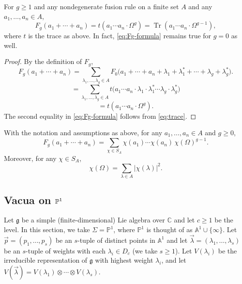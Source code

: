 \documentclass[12pt]{article}
\begin{document}
\begin{proposition}
For $g\ge 1$ and any nondegenerate fusion rule on a finite set $A$ and any $a_1,\dots,a_n\in A$,
\begin{equation}\label{eq:Fg-formula}
F_g(a_1+\cdots + a_n)
= t(a_1\cdots a_n \cdot \Omega^g)
= \operatorname{Tr}(a_1\cdots a_n \cdot \Omega^{g-1}),
\end{equation}
where $t$ is the trace as above. In fact, \eqref{eq:Fg-formula} remains true for $g=0$ as well.
\end{proposition}

\begin{proof}
By the definition of $F_g$,
\[
F_g(a_1+\cdots + a_n)
= \sum_{\lambda_1,\dots,\lambda_g\in A}
F_0\bigl(a_1+\cdots + a_n + \lambda_1+\lambda_1^* + \cdots + \lambda_g+\lambda_g^*\bigr).
\]
\[
= \sum_{\lambda_1,\dots,\lambda_g\in A}
t\bigl(a_1\cdots a_n \cdot \lambda_1\cdot \lambda_1^* \cdots \lambda_g\cdot \lambda_g^*\bigr)
\]
\[
= t(a_1\cdots a_n \cdot \Omega^g).
\]
The second equality in \eqref{eq:Fg-formula} follows from \eqref{eq:trace}.
\end{proof}

\begin{corollary}\label{cor:casimir}
With the notation and assumptions as above, for any $a_1,\dots,a_n\in A$ and $g\ge 0$,
\begin{equation}\label{eq:character-sum}
F_g(a_1+\cdots + a_n)
= \sum_{\chi\in S_A} \chi(a_1)\cdots \chi(a_n)\, \chi(\Omega)^{g-1}.
\end{equation}
Moreover, for any $\chi\in S_A$,
\begin{equation}\label{eq:omega-eigen}
\chi(\Omega) = \sum_{\lambda\in A} |\chi(\lambda)|^2.
\end{equation}
\end{corollary}

\subsection{Vacua on $\P^1$}
Let $\mathfrak g$ be a simple (finite-dimensional) Lie algebra over $\mathbb{C}$ and let $c \ge 1$ be the level.
In this section, we take $\Sigma = \mathbb{P}^1$, where $\mathbb{P}^1$ is thought of as $\mathbb{A}^1 \cup \{\infty\}$.
Let $\vec{p} = (p_1,\dots,p_s)$ be an $s$-tuple of distinct points in $\mathbb{A}^1$ and let
$\vec{\lambda} = (\lambda_1,\dots,\lambda_s)$ be an $s$-tuple of weights with each $\lambda_i \in D_c$ (we take $s \ge 1$). Let $V(\lambda_i)$ be the irreducible representation of $\mathfrak g$ with highest weight $\lambda_i$, and let $V(\vec{\lambda}) = V(\lambda_1) \otimes \cdots \otimes V(\lambda_s)$.
\end{document}
